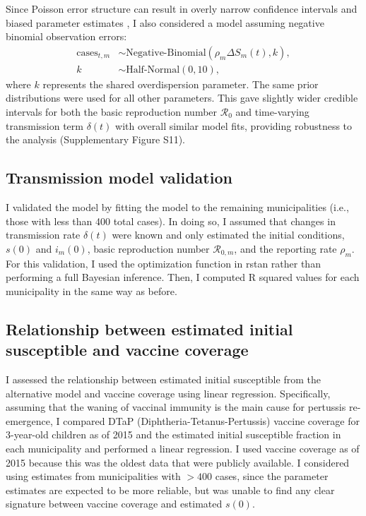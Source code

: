 \documentclass[12pt]{article}
\begin{document}
Since Poisson error structure can result in overly narrow confidence intervals and biased parameter estimates \citep{nvemcova2025unjustified,domenech2026comparison},
I also considered a model assuming negative binomial observation errors:
\begin{align}
\mathrm{cases}_{t,m} &\sim \textrm{Negative-Binomial}(\rho_m \Delta S_m(t), k),\\
k &\sim \textrm{Half-Normal}(0, 10),
\end{align}
where $k$ represents the shared overdispersion parameter.
The same prior distributions were used for all other parameters.
This gave slightly wider credible intervals for both the basic reproduction number $\mathcal R_0$ and time-varying transmission term $\delta(t)$ with overall similar model fits, providing robustness to the analysis (Supplementary Figure S11).

\subsection*{Transmission model validation}

I validated the model by fitting the model to the remaining municipalities (i.e., those with less than 400 total cases).
In doing so, I assumed that changes in transmission rate $\delta(t)$ were known and only estimated the initial conditions, $s(0)$ and $i_m(0)$, basic reproduction number $\mathcal R_{0,m}$, and the reporting rate $\rho_m$.
For this validation, I used the optimization function in rstan \citep{carpenter2017stan} rather than performing a full Bayesian inference.
Then, I computed R squared values for each municipality in the same way as before.

\subsection*{Relationship between estimated initial susceptible and vaccine coverage}

I assessed the relationship between estimated initial susceptible from the alternative model and vaccine coverage using linear regression.
Specifically, assuming that the waning of vaccinal immunity is the main cause for pertussis re-emergence, I compared DTaP (Diphtheria-Tetanus-Pertussis) vaccine coverage for 3-year-old children as of 2015 and the estimated initial susceptible fraction in each municipality and performed a linear regression.
I used vaccine coverage as of 2015 because this was the oldest data that were publicly available.
I considered using estimates from municipalities with $>400$ cases, since the parameter estimates are expected to be more reliable, but was unable to find any clear signature between vaccine coverage and estimated $s(0)$.
\end{document}
